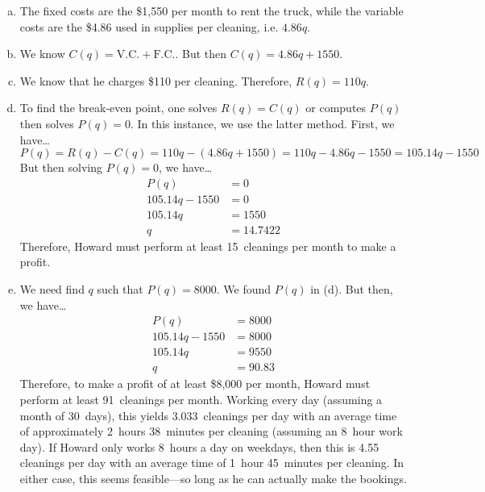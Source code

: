 \documentclass[11pt,letterpaper]{article}
\begin{document}
\sol 
\begin{enumerate}[(a)]
\item The fixed costs are the \$1,550 per month to rent the truck, while the variable costs are the \$4.86 used in supplies per cleaning, i.e. $4.86q$. \pspace

\item We know $C(q)= \text{V.C.} + \text{F.C.}$. But then $C(q)= 4.86q + 1550$. \pspace

\item We know that he charges \$110 per cleaning. Therefore, $R(q)= 110q$. \pspace

\item To find the break-even point, one solves $R(q)= C(q)$ or computes $P(q)$ then solves $P(q)= 0$. In this instance, we use the latter method. First, we have\dots
	\[
	P(q)= R(q) - C(q)= 110q - (4.86q + 1550)= 110q - 4.86q - 1550= 105.14q - 1550
	\]
But then solving $P(q)= 0$, we have\dots
	\[
	\begin{aligned}
	P(q)&= 0 \\
	105.14q - 1550&= 0 \\
	105.14q&= 1550 \\
	q&= 14.7422
	\end{aligned}
	\]
Therefore, Howard must perform at least 15~cleanings per month to make a profit. \pspace

\item We need find $q$ such that $P(q)= 8000$. We found $P(q)$ in (d). But then, we have\dots 
	\[
	\begin{aligned}
	P(q)&= 8000 \\
	105.14q - 1550&= 8000 \\
	105.14q&= 9550 \\
	q&= 90.83
	\end{aligned}
	\]
Therefore, to make a profit of at least \$8,000 per month, Howard must perform at least 91~cleanings per month. Working every day (assuming a month of 30~days), this yields 3.033~cleanings per day with an average time of approximately 2~hours 38~minutes per cleaning (assuming an 8~hour work day). If Howard only works 8~hours a day on weekdays, then this is 4.55 cleanings per day with an average time of 1~hour 45~minutes per cleaning. In either case, this seems feasible---so long as he can actually make the bookings. 
\end{enumerate}



\newpage
\end{document}
